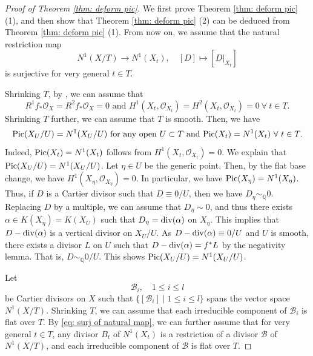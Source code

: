 \documentclass[11pt,oneside,reqno]{amsart}
\numberwithin{equation}{section}
\theoremstyle{definition}
\newcommand{\Pic}{{\rm {Pic}}}
\newcommand{\bQ}{\mathbb{Q}}
\newcommand{\mB}{\mathcal{B}}
\newcommand{\mO}{\mathcal{O}}
\begin{document}
\begin{proof}[Proof of Theorem \ref{thm: deform pic}]
We first prove Theorem \ref{thm: deform pic} (1), and then show that Theorem \ref{thm: deform pic} (2) can be deduced from Theorem \ref{thm: deform pic} (1). From now on, we assume that the natural restriction map 
\begin{equation}\label{eq: surj of natural map}
 N^1(X/T) \to N^1(X_t), \quad [D] \mapsto [D|_{X_t}]   
\end{equation}
is surjective for very general $t\in T$.

Shrinking $T$, by \cite[III, Theorem 12.8, Corollary 12.9]{Har77}, we can assume that
\begin{equation}\label{eq: R1,2}
R^1f_*\mO_X=R^2f_*\mO_X=0 \text{~and~} H^1(X_t, \mO_{X_t})=H^2(X_t, \mO_{X_t})=0~ \forall ~t\in T.
\end{equation} Shrinking $T$ further, we can assume that $T$ is smooth. Then, we have 
\begin{equation}\label{eq: Pic=N}
\Pic(X_U/U) =N^1(X_U/U) \text{~for any open~}U \subset T \text{~and~}
\Pic(X_t)=N^1(X_t) ~\forall ~t\in T.
\end{equation} 
Indeed, $\Pic(X_t)=N^1(X_t)$ follows from $H^1(X_t, \mO_{X_t})=0$. We explain that $\Pic(X_U/U) =N^1(X_U/U)$. Let $\eta\in U$ be the generic point. Then, by the flat base change, we have $H^1(X_\eta, \mO_{X_\eta})=0$. In particular, we have $\Pic(X_\eta)=N^1(X_\eta)$. Thus, if $D$ is a Cartier divisor such that $D \equiv 0/U$, then we have $D_\eta \sim_\bQ 0$. Replacing $D$ by a multiple, we can assume that $D_\eta \sim 0$, and thus there exists $\alpha\in K(X_\eta)=K(X_U)$ such that $D_\eta = {\rm div}(\alpha)$ on $X_\eta$. This implies that $D-{\rm div}(\alpha)$ is a vertical divisor on $X_U/U$. As $D-{\rm div}(\alpha) \equiv 0/U$ and $U$ is smooth, there exists a divisor $L$ on $U$ such that $D-{\rm div}(\alpha)=f^*L$ by the negativity lemma. That is, $D \sim_\bQ 0/U$. This shows $\Pic(X_U/U) =N^1(X_U/U)$. 

Let 
\begin{equation}\label{eq: flat}
\mB_i,\quad 1 \leq i \leq l
\end{equation} be Cartier divisors on $X$ such that $\{[\mB_i] \mid 1 \leq i \leq l\}$ spans the vector space $N^1(X/T)$. Shrinking $T$, we can assume that each irreducible component of $\mB_i$ is flat over $T$. By \eqref{eq: surj of natural map}, we can further assume that for very general $t\in T$, any divisor $B_t$ of $N^1(X_t)$ is a restriction of a divisor $\mB$ of $N^1(X/T)$, and each irreducible component of $\mB$ is flat over $T$.


\end{proof}
\end{document}
